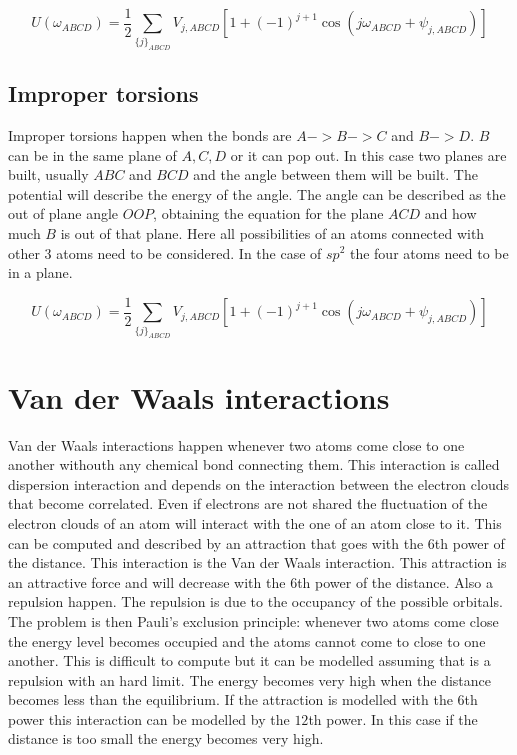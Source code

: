 $$U(\omega_{ABCD}) = \frac{1}{2}\sum\limits_{\{j\}_{ABCD}}V_{j,ABCD}[1+(-1)^{j+1}\cos(j\omega_{ABCD}+\psi_{j,ABCD})]$$

	\subsection{Improper torsions}
	Improper torsions happen when the bonds are $A->B->C$ and $B->D$.
	$B$ can be in the same plane of $A, C, D$ or it can pop out.
	In this case two planes are built, usually $ABC$ and $BCD$ and the angle between them will be built.
	The potential will describe the energy of the angle.
	The angle can be described as the out of plane angle $OOP$, obtaining the equation for the plane $ACD$ and how much $B$ is out of that plane.
	Here all possibilities of an atoms connected with other $3$ atoms need to be considered.
	In the case of $sp^2$ the four atoms need to be in a plane.

	$$U(\omega_{ABCD}) = \frac{1}{2}\sum\limits_{\{j\}_{ABCD}}V_{j,ABCD}[1+(-1)^{j+1}\cos(j\omega_{ABCD}+\psi_{j,ABCD})]$$

\section{Van der Waals interactions}
Van der Waals interactions happen whenever two atoms come close to one another withouth any chemical bond connecting them.
This interaction is called dispersion interaction and depends on the interaction between the electron clouds that become correlated.
Even if electrons are not shared the fluctuation of the electron clouds of an atom will interact with the one of an atom close to it.
This can be computed and described by an attraction that goes with the $6$th power of the distance.
This interaction is the Van der Waals interaction.
This attraction is an attractive force and will decrease with the $6$th power of the distance.
Also a repulsion happen.
The repulsion is due to the occupancy of the possible orbitals.
The problem is then Pauli's exclusion principle: whenever two atoms come close the energy level becomes occupied and the atoms cannot come to close to one another.
This is difficult to compute but it can be modelled assuming that is a repulsion with an hard limit.
The energy becomes very high when the distance becomes less than the equilibrium.
If the attraction is modelled with the $6$th power this interaction can be modelled by the $12$th power.
In this case if the distance is too small the energy becomes very high.


